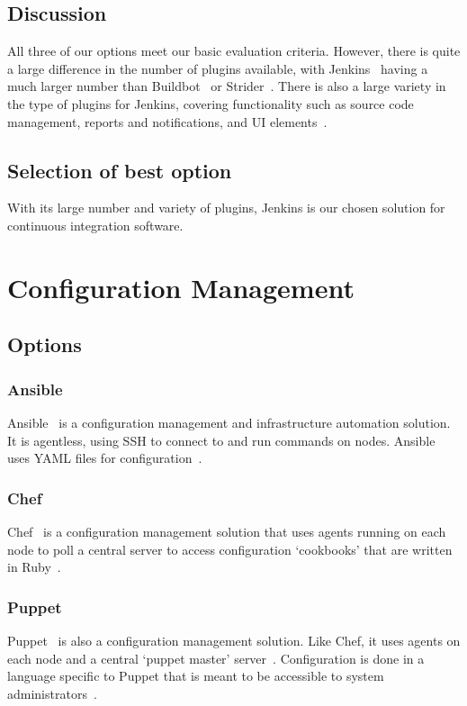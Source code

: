 \documentclass[10pt,letterpaper,onecolumn,journal]{IEEEtran}
\begin{document}
\subsection{Discussion}
All three of our options meet our basic evaluation criteria.
However, there is quite a large difference in the number of plugins available, with Jenkins~\cite{jenkinsplugins} having a much larger number than Buildbot~\cite{buildbotplugins} or Strider~\cite{striderplugins}.
There is also a large variety in the type of plugins for Jenkins, covering functionality such as source code management, reports and notifications, and UI elements~\cite{jenkinsplugins}.
\subsection{Selection of best option}
With its large number and variety of plugins, Jenkins is our chosen solution for continuous integration software.

\section{Configuration Management}
\subsection{Options}
\subsubsection{Ansible}
Ansible~\cite{ansiblemain} is a configuration management and infrastructure automation solution.
It is agentless, using SSH to connect to and run commands on nodes.
Ansible uses YAML files for configuration~\cite{ansibleworks}.
\subsubsection{Chef}
Chef~\cite{chefmain} is a configuration management solution that uses agents running on each node to poll a central server to access configuration `cookbooks' that are written in Ruby~\cite{chefworks}.
\subsubsection{Puppet}
Puppet~\cite{puppetmain} is also a configuration management solution.
Like Chef, it uses agents on each node and a central `puppet master' server~\cite{puppetworks}.
Configuration is done in a language specific to Puppet that is meant to be accessible to system administrators~\cite{puppetlang}.
\end{document}
